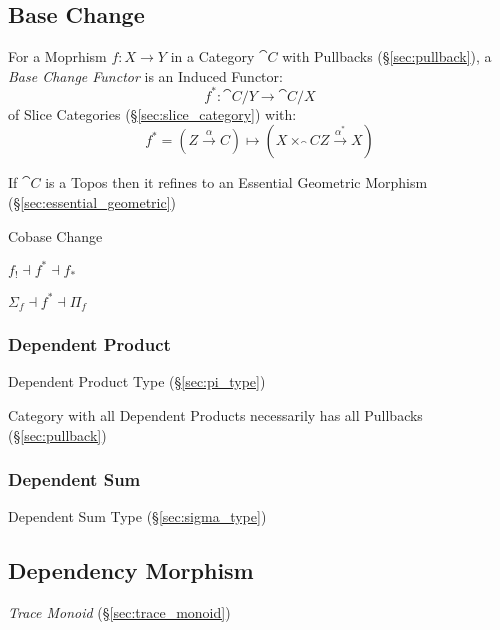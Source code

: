 \subsection{Base Change}\label{sec:base_change}

For a Moprhism $f : X \rightarrow Y$ in a Category $\cat{C}$ with
Pullbacks (\S\ref{sec:pullback}), a \emph{Base Change Functor} is an
Induced Functor:
\[
  f^* : \cat{C}/Y \rightarrow \cat{C}/X
\]
of Slice Categories (\S\ref{sec:slice_category}) with:
\[
  f^* = (Z \xrightarrow{\alpha} C) \mapsto
    (X \times_\cat{C} Z \xrightarrow{\alpha^*} X)
\]

If $\cat{C}$ is a Topos then it refines to an Essential Geometric
Morphism (\S\ref{sec:essential_geometric})


Cobase Change

$f_! \dashv f^* \dashv f_*$

$\Sigma_f \dashv f^* \dashv \Pi_f$



\subsubsection{Dependent Product}\label{sec:dependent_product}

Dependent Product Type (\S\ref{sec:pi_type})

Category with all Dependent Products necessarily has all Pullbacks
(\S\ref{sec:pullback})



\subsubsection{Dependent Sum}\label{sec:dependent_sum}

Dependent Sum Type (\S\ref{sec:sigma_type})



\subsection{Dependency Morphism}\label{sec:dependency_morphism}

\emph{Trace Monoid} (\S\ref{sec:trace_monoid})



